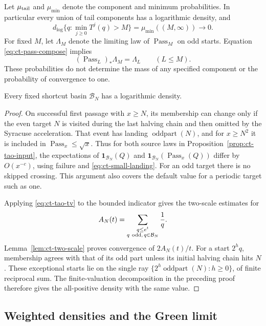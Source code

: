 Let \(\mu_{\rm tail}\) and \(\mu_{\min}\) denote the component
and minimum probabilities. In particular every union of tail
components has a logarithmic density, and
\begin{equation}\label{eq:ct-min-tight}
 d_{\log}\{q:\min_{j\ge0}T^j(q)>M\}
       =\mu_{\min}((M,\infty))\longrightarrow0.
\end{equation}
For fixed \(M\), let \(\Lambda_M\) denote the limiting law of
\(\operatorname{Pass}_M\) on odd starts. Equation
\eqref{eq:ct-pass-compose} implies
\[
 (\operatorname{Pass}_L)_*\Lambda_M=\Lambda_L\qquad(L\le M).
\]
These probabilities do not determine the mass of any specified
component or the probability of convergence to one.

\begin{proposition}\label{prop:ct-basin-density}
Every fixed shortcut basin \(\mathcal B_N\) has a logarithmic density.
\end{proposition}
\begin{proof}
On successful first passage with \(x\ge N\), its membership can
change only if the even target \(N\) is visited during the last
halving chain and then omitted by the Syracuse acceleration.
That event has landing \(\operatorname{oddpart}(N)\), and for
\(x\ge N^2\) it is included in
\(\operatorname{Pass}_x\le\sqrt x\).
Thus for both source laws in Proposition~\ref{prop:ct-tao-input},
the expectations of
\(\mathbf1_{\mathcal B_N}(Q)\) and
\(\mathbf1_{\mathcal B_N}(\operatorname{Pass}_x(Q))\)
differ by \(O(x^{-c})\), using failure and
\eqref{eq:ct-small-landing}. For an odd target there is no skipped
crossing. This argument also covers the default value for a
periodic target such as one.

Applying \eqref{eq:ct-tao-tv} to the bounded indicator gives the
two-scale estimates for
\[
 A_N(t)=\sum_{\substack{q\le e^t\\q\ {\rm odd},\,q\in\mathcal B_N}}
                         \frac1q.
\]
Lemma~\ref{lem:ct-two-scale} proves convergence of \(2A_N(t)/t\).
For a start \(2^hq\), membership agrees with that of its odd part
unless its initial halving chain hits \(N\). These exceptional
starts lie on the single ray
\(\{2^h\operatorname{oddpart}(N):h\ge0\}\), of finite reciprocal
sum. The finite-valuation decomposition in the preceding proof
therefore gives the all-positive density with the same value.
\end{proof}

\subsection{Weighted densities and the Green limit}

